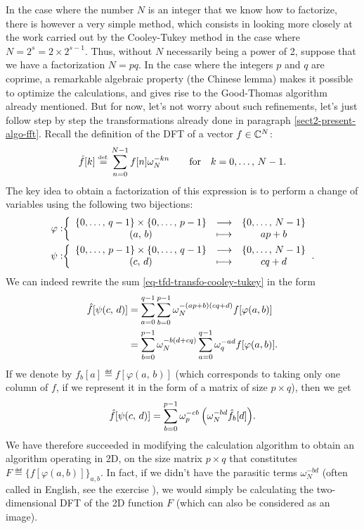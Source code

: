  
In the case where the number $N$ is an integer that we know how to factorize, there is however a very simple method, which consists in looking more closely at the work carried out by the Cooley-Tukey method in the case where $ N = 2^s = 2 \times 2^{s-1} $. Thus, without $N$ necessarily being a power of 2, suppose that we have a factorization $ N = pq $. In the case where the integers $ p $ and $ q $ are coprime, a remarkable algebraic property (the Chinese lemma) makes it possible to optimize the calculations, and gives rise to the Good-Thomas algorithm already mentioned. But for now, let's not worry about such refinements, let's just follow step by step the transformations already done  in paragraph \ref{sect2-present-algo-fft}. Recall the definition of the DFT of a vector $ f \in \mathbb{C}^N $:
\begin{equation}
\label{eq-tfd-transfo-cooley-tukey}
\hat{f}[k] \stackrel{\mbox{\upshape\tiny def.}}{=} \sum_{n = 0}^{N-1}{f[n] \omega_N^{- kn}} \quad \quad \text{for} \quad k = 0 , \ldots, \, N-1.
\end{equation}
The key idea to obtain a factorization of this expression is to perform a change of variables using the following two bijections:
\begin{equation*}
\begin{split}
\varphi: & {\left\{ \begin{array}{ccc} \{0, \ldots, \, q-1\} \times \{0, \ldots, \, p-1\} & \longrightarrow & \{0, \ldots, \, N- 1\} \\ (a, \, b) & \longmapsto & ap + b \end{array} \right.} \\
\psi: & {\left\{ \begin{array}{ccc} \{0, \ldots, \, p-1\} \times \{0, \ldots, \, q-1\} & \longrightarrow & \{0, \ldots, \, N- 1\} \\ (c, \, d) & \longmapsto & cq + d \end{array} \right.}.
\end{split}
\end{equation*}
We can indeed rewrite the sum \eqref{eq-tfd-transfo-cooley-tukey} in the form
\begin{equation*}
\begin{split}
\hat{f}[\psi (c, \, d)] & = \sum_{a = 0}^{q-1}{\sum_{b = 0}^{p-1}{\omega_N^{- (ap + b) (cq + d)} f[\varphi (a, b)]}} \\
& = \sum_{b = 0}^{p-1}{\omega_N^{- b (d + cq)} \sum_{a = 0}^{q-1}{\omega_q^{- ad} f[\varphi (a, b)]}}.
\end{split}
\end{equation*}
If we denote by $ f_b [a] \eqdef f[\varphi (a, \, b)] $ (which corresponds to taking only one column of $ f $, if we represent it in the form of a matrix of size $ p \times q $), then we get
\begin{equation}
\label{eqn-cooley-tukey-twiddle}
\hat{f}[\psi (c, \, d)] = \sum_{b = 0}^{p-1}{\omega_p^{- cb} \left(\omega_N^{- bd} \hat{f_b}[d] \right)}.
\end{equation}
 We have therefore succeeded in modifying the calculation algorithm to obtain an algorithm operating in 2D, on the size matrix $ p \times q $ that constitutes $ F \eqdef \{f[\varphi (a , b)]\}_{a, b} $. In fact, if we didn't have the parasitic terms $ \omega_N^{- bd} $ (often called  in English, see the exercise ), we would simply be calculating the two-dimensional DFT of the 2D function $ F $ (which can also be considered as an image).
 

